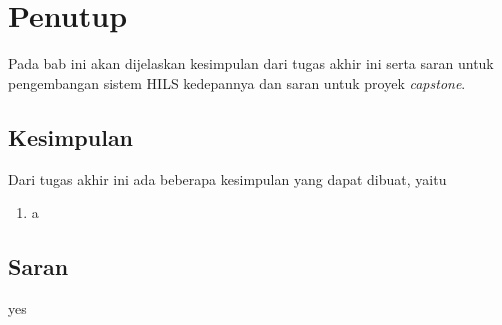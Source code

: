 \chapter{Penutup}\label{chapter-5}

Pada bab ini akan dijelaskan kesimpulan dari tugas akhir ini serta saran untuk
pengembangan sistem HILS kedepannya dan saran untuk proyek \textit{capstone}.

\section{Kesimpulan}

Dari tugas akhir ini ada beberapa kesimpulan yang dapat dibuat, yaitu
\begin{enumerate}
	\item a
\end{enumerate}

\section{Saran}

yes
